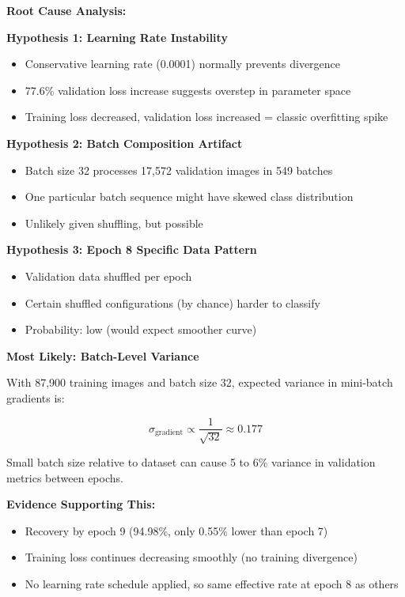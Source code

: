 \documentclass[11pt,a4paper]{article}
\begin{document}
\textbf{Root Cause Analysis:}

\textbf{Hypothesis 1: Learning Rate Instability}
\begin{itemize}
  \item Conservative learning rate (0.0001) normally prevents divergence
  \item 77.6\% validation loss increase suggests overstep in parameter space
  \item Training loss decreased, validation loss increased = classic overfitting spike
\end{itemize}

\textbf{Hypothesis 2: Batch Composition Artifact}
\begin{itemize}
  \item Batch size 32 processes 17,572 validation images in 549 batches
  \item One particular batch sequence might have skewed class distribution
  \item Unlikely given shuffling, but possible
\end{itemize}

\textbf{Hypothesis 3: Epoch 8 Specific Data Pattern}
\begin{itemize}
  \item Validation data shuffled per epoch
  \item Certain shuffled configurations (by chance) harder to classify
  \item Probability: low (would expect smoother curve)
\end{itemize}

\textbf{Most Likely: Batch-Level Variance}

With 87,900 training images and batch size 32, expected variance in mini-batch gradients is:

\begin{equation}
\sigma_{\text{gradient}} \propto \frac{1}{\sqrt{32}} \approx 0.177
\end{equation}

Small batch size relative to dataset can cause 5 to 6\% variance in validation metrics between epochs.

\textbf{Evidence Supporting This:}
\begin{itemize}
  \item Recovery by epoch 9 (94.98\%, only 0.55\% lower than epoch 7)
  \item Training loss continues decreasing smoothly (no training divergence)
  \item No learning rate schedule applied, so same effective rate at epoch 8 as others
\end{itemize}
\end{document}

